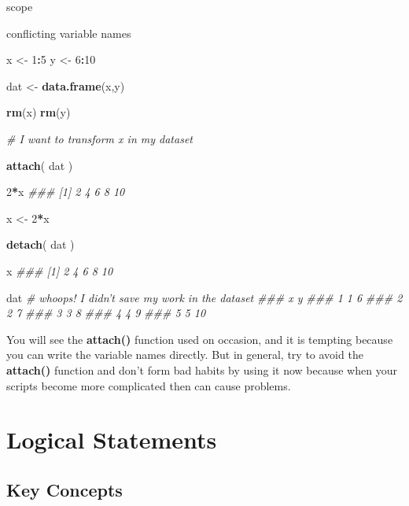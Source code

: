 \documentclass[]{book}
\newenvironment{Shaded}{\begin{snugshade}}{\end{snugshade}}
\newcommand{\CommentTok}[1]{\textcolor[rgb]{0.56,0.35,0.01}{\textit{#1}}}
\newcommand{\DecValTok}[1]{\textcolor[rgb]{0.00,0.00,0.81}{#1}}
\newcommand{\KeywordTok}[1]{\textcolor[rgb]{0.13,0.29,0.53}{\textbf{#1}}}
\newcommand{\NormalTok}[1]{#1}
\newcommand{\OperatorTok}[1]{\textcolor[rgb]{0.81,0.36,0.00}{\textbf{#1}}}
\newcommand{\StringTok}[1]{\textcolor[rgb]{0.31,0.60,0.02}{#1}}
\theoremstyle{definition}
\theoremstyle{definition}
\theoremstyle{definition}
\theoremstyle{remark}
\begin{document}
scope

conflicting variable names

\begin{Shaded}
\begin{Highlighting}[]

\NormalTok{x <-}\StringTok{ }\DecValTok{1}\OperatorTok{:}\DecValTok{5}
\NormalTok{y <-}\StringTok{ }\DecValTok{6}\OperatorTok{:}\DecValTok{10}

\NormalTok{dat <-}\StringTok{ }\KeywordTok{data.frame}\NormalTok{(x,y)}

\KeywordTok{rm}\NormalTok{(x)}
\KeywordTok{rm}\NormalTok{(y)}


\CommentTok{# I want to transform x in my dataset}

\KeywordTok{attach}\NormalTok{( dat )}

\DecValTok{2}\OperatorTok{*}\NormalTok{x}
\CommentTok{### [1]  2  4  6  8 10}

\NormalTok{x <-}\StringTok{ }\DecValTok{2}\OperatorTok{*}\NormalTok{x}

\KeywordTok{detach}\NormalTok{( dat )}

\NormalTok{x}
\CommentTok{### [1]  2  4  6  8 10}

\NormalTok{dat  }\CommentTok{# whoops! I didn't save my work in the dataset}
\CommentTok{###   x  y}
\CommentTok{### 1 1  6}
\CommentTok{### 2 2  7}
\CommentTok{### 3 3  8}
\CommentTok{### 4 4  9}
\CommentTok{### 5 5 10}
\end{Highlighting}
\end{Shaded}

You will see the \textbf{attach()} function used on occasion, and it is
tempting because you can write the variable names directly. But in
general, try to avoid the \textbf{attach()} function and don't form bad
habits by using it now because when your scripts become more complicated
then can cause problems.

\hypertarget{logical-statements}{%
\chapter{Logical Statements}\label{logical-statements}}

\hypertarget{key-concepts-2}{%
\section{Key Concepts}\label{key-concepts-2}}
\end{document}
